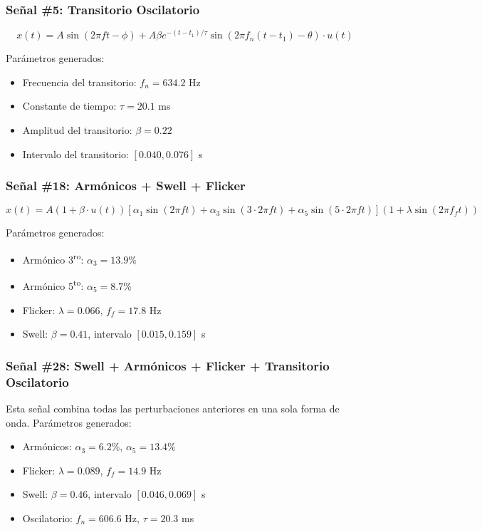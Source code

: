 \documentclass[12pt,a4paper]{article}
\begin{document}
\subsubsection{Señal \#5: Transitorio Oscilatorio}

\begin{equation}
x(t) = A\sin(2\pi f t - \phi) + A\beta e^{-(t-t_1)/\tau}\sin(2\pi f_n(t-t_1) - \theta) \cdot u(t)
\end{equation}

Parámetros generados:
\begin{itemize}
    \item Frecuencia del transitorio: $f_n = 634.2$ Hz
    \item Constante de tiempo: $\tau = 20.1$ ms
    \item Amplitud del transitorio: $\beta = 0.22$
    \item Intervalo del transitorio: $[0.040, 0.076]$ s
\end{itemize}


\subsubsection{Señal \#18: Armónicos + Swell + Flicker}

\begin{equation}
x(t) = A(1+\beta \cdot u(t))\left[\alpha_1\sin(2\pi f t) + \alpha_3\sin(3 \cdot 2\pi f t) + \alpha_5\sin(5 \cdot 2\pi f t)\right](1+\lambda\sin(2\pi f_f t))
\end{equation}

Parámetros generados:
\begin{itemize}
    \item Armónico 3\textsuperscript{ro}: $\alpha_3 = 13.9\%$
    \item Armónico 5\textsuperscript{to}: $\alpha_5 = 8.7\%$
    \item Flicker: $\lambda = 0.066$, $f_f = 17.8$ Hz
    \item Swell: $\beta = 0.41$, intervalo $[0.015, 0.159]$ s
\end{itemize}

\subsubsection{Señal \#28: Swell + Armónicos + Flicker + Transitorio Oscilatorio}

Esta señal combina todas las perturbaciones anteriores en una sola forma de onda. Parámetros generados:
\begin{itemize}
    \item Armónicos: $\alpha_3 = 6.2\%$, $\alpha_5 = 13.4\%$
    \item Flicker: $\lambda = 0.089$, $f_f = 14.9$ Hz
    \item Swell: $\beta = 0.46$, intervalo $[0.046, 0.069]$ s
    \item Oscilatorio: $f_n = 606.6$ Hz, $\tau = 20.3$ ms
\end{itemize}
\end{document}
